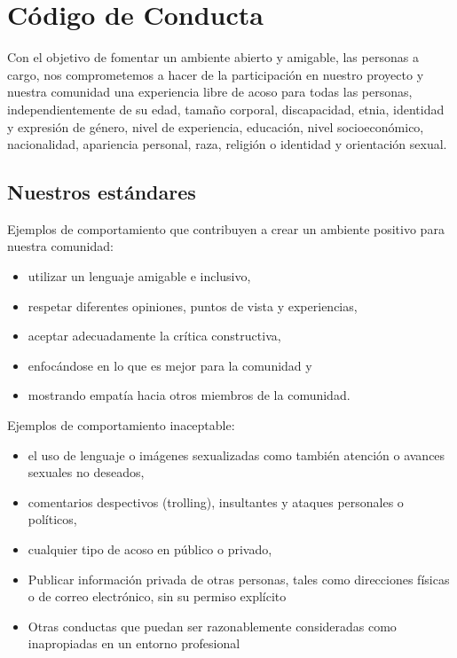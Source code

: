 \chapter{Código de Conducta}\label{s:conduct}

Con el objetivo de fomentar un ambiente abierto y amigable, las personas 
a cargo, nos comprometemos a hacer de la participación en nuestro proyecto 
y nuestra comunidad una experiencia libre de acoso para todas las personas, 
independientemente de su edad, tama\~no corporal, discapacidad, etnia, 
identidad y expresión de género, nivel de experiencia, educación, 
nivel socioeconómico, nacionalidad, apariencia personal, raza, 
religión o identidad y orientación sexual.

\section*{Nuestros estándares}

Ejemplos de comportamiento que contribuyen a crear un ambiente positivo 
para nuestra comunidad:

\begin{itemize}
\item
  utilizar un lenguaje amigable e inclusivo, 
\item
  respetar diferentes opiniones, puntos de vista y experiencias,
\item
  aceptar adecuadamente la crítica constructiva,
\item
  enfocándose en lo que es mejor para la comunidad y
\item
  mostrando empatía hacia otros miembros de la comunidad.
\end{itemize}

\noindent
Ejemplos de comportamiento inaceptable:

\begin{itemize}
\item
  el uso de lenguaje o imágenes sexualizadas como también 
  atención o avances sexuales no deseados,
\item
  comentarios despectivos (trolling), insultantes y ataques personales o políticos,
\item
  cualquier tipo de acoso en público o privado,
\item
  Publicar información privada de otras personas, tales como direcciones 
  físicas o de correo electrónico, sin su permiso explícito
\item
  Otras conductas que puedan ser razonablemente consideradas 
  como inapropiadas en un entorno profesional
\end{itemize}

